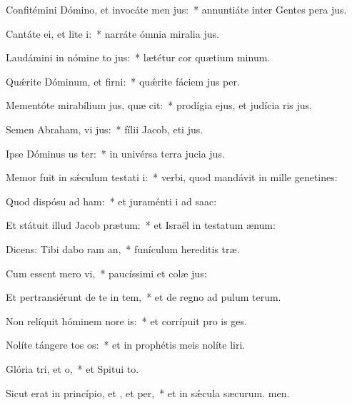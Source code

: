 \item Confitémini Dómino, et invocáte men jus:~* annuntiáte inter Gentes pera jus.
\item Cantáte ei, et lite i:~* narráte ómnia miralia jus.
\item Laudámini in nómine to jus:~* lætétur cor quætium minum.
\item Quǽrite Dóminum, et firni:~* quǽrite fáciem jus per.
\item Mementóte mirabílium jus, quæ cit:~* prodígia ejus, et judícia ris jus.
\item Semen Abraham, vi jus:~* fílii Jacob, eti jus.
\item Ipse Dóminus us ter:~* in univérsa terra jucia jus.
\item Memor fuit in sǽculum testati i:~* verbi, quod mandávit in mille genetines:
\item Quod dispósu ad ham:~* et juraménti i ad saac:
\item Et státuit illud Jacob  prætum:~* et Israël in testatum ænum:
\item Dicens: Tibi dabo ram an,~* funículum hereditis træ.
\item Cum essent mero vi,~* paucíssimi et colæ jus:
\item Et pertransiérunt de te in tem,~* et de regno ad pulum terum.
\item Non relíquit hóminem nore is:~* et corrípuit pro is ges.
\item Nolíte tángere tos os:~* et in prophétis meis nolíte liri.
\item Glória tri, et o,~* et Spitui to.
\item Sicut erat in princípio, et , et per,~* et in sǽcula sæcurum. men.
